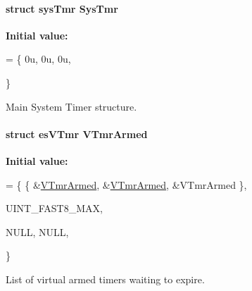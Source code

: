 \hypertarget{group__kern__impl_gaf4fd8bfc453bbab3d94186c863a180c0}{
\paragraph[{Sys\-Tmr}]{\setlength{\rightskip}{0pt plus 5cm}struct {\bf sys\-Tmr} Sys\-Tmr\hspace{0.3cm}{\ttfamily [static]}}}\label{group__kern__impl_gaf4fd8bfc453bbab3d94186c863a180c0}
{\bfseries Initial value\-:}
\begin{DoxyCode}
= \{
    0u,
    0u,
    0u,



\}
\end{DoxyCode}


Main System Timer structure. 

\hypertarget{group__kern__impl_ga49813e0a9a014d99d076943e96b2408c}{
\paragraph[{V\-Tmr\-Armed}]{\setlength{\rightskip}{0pt plus 5cm}struct {\bf es\-V\-Tmr} V\-Tmr\-Armed\hspace{0.3cm}{\ttfamily [static]}}}\label{group__kern__impl_ga49813e0a9a014d99d076943e96b2408c}
{\bfseries Initial value\-:}
\begin{DoxyCode}
= \{
   \{
        &\hyperlink{group__kern__impl_ga49813e0a9a014d99d076943e96b2408c}{VTmrArmed},
        &\hyperlink{group__kern__impl_ga49813e0a9a014d99d076943e96b2408c}{VTmrArmed},
        &VTmrArmed
   \},


   UINT\_FAST8\_MAX,





   NULL,
   NULL,



\}
\end{DoxyCode}


List of virtual armed timers waiting to expire. 

